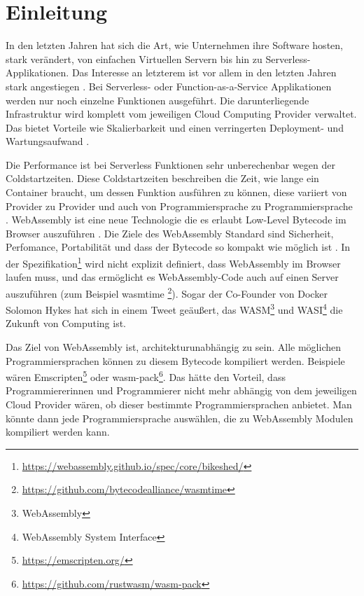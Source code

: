 \section{Einleitung}
\label{section:Introduction}

In den letzten Jahren hat sich die Art, wie Unternehmen ihre Software hosten, stark verändert, von einfachen Virtuellen Servern bis hin zu Serverless-Applikationen. Das Interesse an letzterem ist vor allem in den letzten Jahren stark angestiegen \autocite[p.~1]{Baldini}. Bei Serverless- oder Function-as-a-Service Applikationen werden nur noch einzelne Funktionen ausgeführt. Die darunterliegende Infrastruktur wird komplett vom jeweiligen Cloud Computing Provider verwaltet. Das bietet Vorteile wie Skalierbarkeit und einen verringerten Deployment- und Wartungsaufwand \autocite[p.~3]{Shafiei2019}.

Die Performance ist bei Serverless Funktionen sehr unberechenbar wegen der Coldstartzeiten. Diese Coldstartzeiten beschreiben die Zeit, wie lange ein Container braucht, um dessen Funktion ausführen zu können, diese variiert von Provider zu Provider und auch von Programmiersprache zu Programmiersprache \autocite[p.~138--139]{Wang}. WebAssembly ist eine neue Technologie die es erlaubt Low-Level Bytecode im Browser auszuführen \autocite[p.~186]{Haas2017}. Die Ziele des WebAssembly Standard sind Sicherheit, Perfomance, Portabilität und dass der Bytecode so kompakt wie möglich ist \autocite[p.~186]{Haas2017}. In der Spezifikation\footnote{\url{https://webassembly.github.io/spec/core/bikeshed/}} wird nicht explizit definiert, dass WebAssembly im Browser laufen muss, und das ermöglicht es WebAssembly-Code auch auf einen Server auszuführen (zum Beispiel wasmtime \footnote{\url{https://github.com/bytecodealliance/wasmtime}}). Sogar der Co-Founder von Docker Solomon Hykes hat sich in einem Tweet geäußert, das WASM\footnote{WebAssembly} und WASI\footnote{WebAssembly System Interface} die Zukunft von Computing ist. \autocite[]{solomontwitter}

Das Ziel von WebAssembly ist, architekturunabhängig \autocite[p.~186]{Haas2017} zu sein. Alle möglichen Programmiersprachen können zu diesem Bytecode kompiliert werden. Beispiele wären Emscripten\footnote{\url{https://emscripten.org/}} oder wasm-pack\footnote{\url{https://github.com/rustwasm/wasm-pack}}. Das hätte den Vorteil, dass Programmiererinnen und Programmierer nicht mehr abhängig von dem jeweiligen Cloud Provider wären, ob dieser bestimmte Programmiersprachen anbietet. Man könnte dann jede Programmiersprache auswählen, die zu WebAssembly Modulen kompiliert werden kann.

